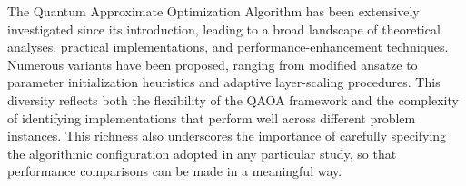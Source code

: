 The Quantum Approximate Optimization Algorithm has been extensively investigated since its introduction, leading to a broad landscape of theoretical analyses, practical  implementations, and performance-enhancement techniques. Numerous variants have been proposed, ranging from modified ansatze to parameter initialization heuristics and adaptive layer-scaling procedures. This diversity reflects both the flexibility of the QAOA framework and the complexity of identifying implementations that perform well across different problem instances. This richness also underscores the importance of carefully specifying the algorithmic configuration adopted in any particular study, so that performance comparisons can be made in a meaningful way.